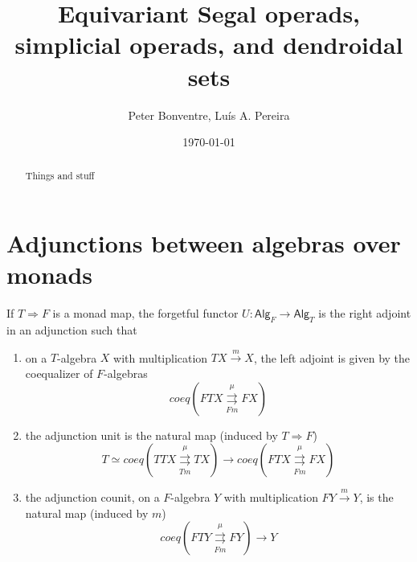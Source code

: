 \documentclass[a4paper,10pt
]{article}%
\title{Equivariant Segal operads, simplicial operads, and dendroidal sets}
\author{Peter Bonventre, Lu\'is A. Pereira}%
\date{\today}
\renewcommand{\1}{\eta}%
\begin{document}
\maketitle

\begin{abstract}
      Things and stuff
\end{abstract}

\tableofcontents



\section{Adjunctions between algebras over monads}




\begin{proposition}\label{GENMONS PROP}
If $T \Rightarrow F$ is a monad map,
the forgetful functor
$U \colon \mathsf{Alg}_F \to \mathsf{Alg}_T$
is the right adjoint in an adjunction such that
\begin{enumerate}[label=(\roman*)]
\item on a $T$-algebra $X$ with multiplication $TX \xrightarrow{m} X$,
the left adjoint is given by the coequalizer of $F$-algebras
\begin{equation}\label{LEFTADJFOR EQ}
coeq \left( F T X 
\overset{\mu}{\underset{Fm}{\rightrightarrows}}
F X\right)
\end{equation}
\item the adjunction unit
is the natural map (induced by $T \Rightarrow F$)
\[
T \simeq coeq \left( T T X 
\overset{\mu}{\underset{Tm}{\rightrightarrows}}
T X\right)
	\to
coeq \left( F T X 
\overset{\mu}{\underset{Fm}{\rightrightarrows}}
F X\right)
\]
\item 
the adjunction counit, on a $F$-algebra $Y$ with multiplication 
$FY \xrightarrow{m} Y$, is the natural map (induced by $m$)
\[
coeq \left( F T Y 
\overset{\mu}{\underset{Fm}{\rightrightarrows}}
F Y\right)
\to
Y
\]
\end{enumerate}
\end{proposition}
\end{document}
